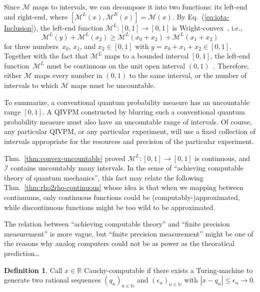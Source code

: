 \documentclass[english,reprint, aps, prl,superscriptaddress, showpacs,
showkeys, longbibliography, amsmath, amssymb, floatfix]{revtex4-1}
\theoremstyle{plain}
\theoremstyle{definition}
\newtheorem{definition}{Definition}
\newcommand{\ultramodular}{\mathcal{M}}
\newcommand{\ultramodularL}[1][]{\ensuremath{\ultramodular^{L{#1}}}}
\newcommand{\ultramodularR}[1][]{\ensuremath{\ultramodular^{R{#1}}}}
\newcommand{\says}[3]{\begin{framed}\begin{minipage}{0.9\linewidth}\color{#1}{#2 says: #3}\end{minipage}\end{framed}}
\newcommand{\yutsung}[1]{\says{purple}{Yu-Tsung}{#1}}
\newcommand{\andy}[1]{\says{blue}{Andy}{#1}}
\begin{document}
Since $\ultramodular$ maps to intervals, we can decompose it into
two functions: its left-end and right-end, where
 $\left[\ultramodularL\left(x\right),\ultramodularR\left(x\right)\right]=\ultramodular\left(x\right)$.
By Eq.~(\ref{eq:iota-Inclusion}), the left-end function $\ultramodularL:\left[0,1\right]\rightarrow\left[0,1\right]$
is Wright-convex~\cite{Wright1954,RobertsVarberg1973,PecaricTong1992},
i.e., 
\[
\ultramodularL\left(y\right)+\ultramodularL\left(x_{2}\right)\ge\ultramodularL\left(x_{0}+x_{2}\right)+\ultramodularL\left(x_{1}+x_{2}\right)
\]
for three numbers~$x_{0}$, $x_{1}$, and $x_{2}\in\left[0,1\right]$ with
$y=x_{0}+x_{1}+x_{2}\in\left[0,1\right]$. 
Together with the fact that $\ultramodularL$ maps to a bounded
interval $\left[0,1\right]$, the left-end function~$\ultramodularL$
must be continuous on the unit open interval
$\left(0,1\right)$~\cite{MarinacciMontrucchio2005}.  Therefore,
either $\ultramodular$ maps every number in {\color{red}$\left(0,1\right)$} to the
same interval, or the number of intervals to which $\ultramodular$ maps
must be uncountable.

To summarize, a conventional quantum probability measure has an
uncountable range $[0,1]$. A QIVPM constructed by blurring such a
conventional quantum probability measure must also have an uncountable
range of intervals. Of course, any particular QIVPM, or any particular
experiment, will use a fixed collection of intervals appropriate for
the resources and precision of the particular experiment. 

\andy{no ending? What was the point of the section?}
\yutsung{Begin of comments}
Thm.~\ref{thm:convex-uncountable} proved
$\ultramodularL:\left[0,1\right]\rightarrow\left[0,1\right]$ is continuous, and
$\mathscr{I}$ contains uncountably many intervals. In the sense of ``achieving
computable theory of quantum mechanics'', this fact may relate the following
Thm.~\ref{thm:rho2rho-continuous} \cite{Ziegler2007,weihrauch2012computable}
whose idea is that when we mapping between continuums, only continuous functions
could be (computably-)approximated, while discontinuous functions might be too
wild to be approximated. 

The relation between ``achieving computable theory''
and ``finite precision measurement'' is more vague, but ``finite precision
measurement'' might be one of the reasons why analog computers could not be as
power as the theoratical prediction\ldots

\begin{definition}
Call $x\in\mathbb{R}$ Cauchy-computable if there exists a Turing-machine to
generate two rational sequences $\left(q_{n}\right)_{n\in\mathbb{N}}$ and
$\left(\epsilon_{n}\right)_{n\in\mathbb{N}}$ with
$\left|x-q_{n}\right|\le\epsilon_{n}\rightarrow 0$.
\end{definition}
\end{document}
